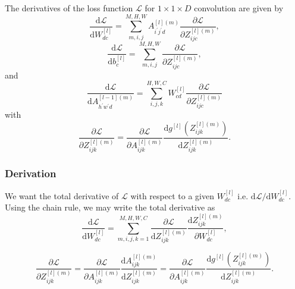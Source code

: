 \documentclass[modern]{aastex61}
\newcommand{\uderivative}{\mathrm{d}}
\begin{document}
The derivatives of the loss function $\mathscr{L}$ for $1 \times 1 \times D$ convolution are given by
\begin{equation} \label{eq:conv11dW}
  \frac{\uderivative \mathscr{L}}{\uderivative W^{[l]}_{dc}} = \sum_{m,i,j}^{M,H,W} A^{[l](m)}_{i^{'}j^{'}d}  \frac{\partial \mathscr{L}}{\partial Z^{[l](m)}_{ijc}},
\end{equation}
\begin{equation} \label{eq:conv11db}
  \frac{\uderivative \mathscr{L}}{\uderivative b^{[l]}_{c}} = \sum_{m,i,j}^{M,H,W} \frac{\partial \mathscr{L}}{\partial Z^{[l](m)}_{ijc}},
\end{equation}
and
\begin{equation} \label{eq:conv11dA_lMinus}
  \frac{\uderivative \mathscr{L}}{\uderivative A^{[l-1](m)}_{h^{'}w^{'}d}} = \sum_{i,j,k}^{H,W,C} W^{[l]}_{cd}  \frac{\partial \mathscr{L}}{\partial Z^{[l](m)}_{ijc}}
\end{equation}
with
\begin{equation} \label{eq:conv11dZ}
  \frac{\partial \mathscr{L}}{\partial Z^{[l](m)}_{ijk}} = \frac{\partial \mathscr{L}}{\partial A^{[l](m)}_{ijk}} \frac{\uderivative g^{[l]}(Z^{[l](m)}_{ijk})}{\uderivative Z^{[l](m)}_{ijk}}.
\end{equation}

\subsubsection{Derivation}

We want the total derivative of $\mathscr{L}$ with respect to a given $W^{[l]}_{dc}$ i.e. $\uderivative \mathscr{L}/\uderivative W^{[l]}_{dc}$. Using the chain rule, we may write the total derivative as
\begin{equation*}
  \frac{\uderivative \mathscr{L}}{\uderivative W^{[l]}_{dc}} = \sum_{m,i,j,k=1}^{M,H,W,C} \frac{\partial \mathscr{L}}{\uderivative Z^{[l](m)}_{ijk}} \frac{\uderivative Z^{[l](m)}_{ijk}}{\partial W^{[l]}_{dc}},
\end{equation*}

\begin{equation} \label{eq:conv11dZ}
  \frac{\partial \mathscr{L}}{\partial Z^{[l](m)}_{ijk}} = \frac{\partial \mathscr{L}}{\partial A^{[l](m)}_{ijk}} \frac{\uderivative A^{[l](m)}_{ijk}}{\uderivative Z^{[l](m)}_{ijk}} = \frac{\partial \mathscr{L}}{\partial A^{[l](m)}_{ijk}} \frac{\uderivative g^{[l]}(Z^{[l](m)}_{ijk})}{\uderivative Z^{[l](m)}_{ijk}}.
\end{equation}
\end{document}
